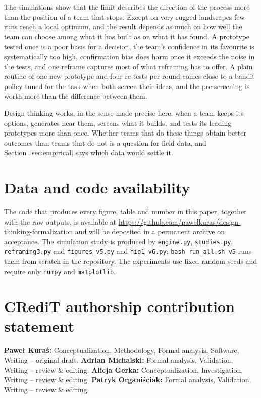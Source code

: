 \documentclass[10pt,twocolumn]{article}
\theoremstyle{definition}
\begin{document}
The simulations show that the limit describes the direction of the process more than the position of a team that stops. Except on very rugged landscapes few runs reach a local optimum, and the result depends as much on how well the team can choose among what it has built as on what it has found. A prototype tested once is a poor basis for a decision, the team's confidence in its favourite is systematically too high, confirmation bias does harm once it exceeds the noise in the tests, and one reframe captures most of what reframing has to offer. A plain routine of one new prototype and four re-tests per round comes close to a bandit policy tuned for the task when both screen their ideas, and the pre-screening is worth more than the difference between them.

Design thinking works, in the sense made precise here, when a team keeps its options, generates near them, screens what it builds, and tests its leading prototypes more than once. Whether teams that do these things obtain better outcomes than teams that do not is a question for field data, and Section~\ref{sec:empirical} says which data would settle it.

\section*{Data and code availability}
The code that produces every figure, table and number in this paper, together with the raw outputs, is available at \url{https://github.com/pawelkuras/design-thinking-formalization} and will be deposited in a permanent archive on acceptance. The simulation study is produced by \texttt{engine.py}, \texttt{studies.py}, \texttt{reframing3.py} and \texttt{figures\_v5.py} and \texttt{fig1\_v6.py}; \texttt{bash run\_all.sh v5} runs them from scratch in the repository. The experiments use fixed random seeds and require only \texttt{numpy} and \texttt{matplotlib}.

\section*{CRediT authorship contribution statement}
\textbf{Pawe\l{} Kura\'s:} Conceptualization, Methodology, Formal analysis, Software, Writing -- original draft. \textbf{Adrian Michalski:} Formal analysis, Validation, Writing -- review \& editing. \textbf{Alicja Gerka:} Conceptualization, Investigation, Writing -- review \& editing. \textbf{Patryk Organi\'sciak:} Formal analysis, Validation, Writing -- review \& editing.
\end{document}

